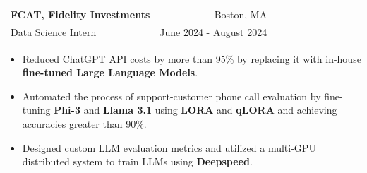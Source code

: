 \documentclass[a4paper]{article}
\makeatletter
\newcommand{\resumeItemWithoutTitle}[1]{
  \item\small{
    {\vspace{-2pt}}
  }
}
\newcommand{\resumeSubheading}[4]{
  \vspace{-1pt}\item
    \begin{tabular*}{0.97\textwidth}{l@{\extracolsep{\fill}}r}
      \textbf{#1} & #2 \\
      {#3} & {#4} \\
    \end{tabular*}\vspace{-5pt}
}
\newcommand{\resumeItemListStart}{\begin{itemize}[leftmargin=*]}
\newcommand{\resumeItemListEnd}{\end{itemize}\vspace{-5pt}}
\makeatother
\begin{document}
  \resumeSubheading{FCAT, Fidelity Investments}{Boston, MA}
    {\underline{Data Science Intern}}{June 2024 - August 2024}
    \resumeItemListStart
\vspace{1pt}
      \resumeItemWithoutTitle{Multi Touch Attribution Project}
    {
        Reduced ChatGPT API costs by more than 95\% by replacing it with in-house \textbf{fine-tuned Large Language Models}. 
    }
      \resumeItemWithoutTitle{Multi Touch Attribution Project}
    {
        Automated the process of support-customer phone call evaluation by fine-tuning  \textbf{Phi-3} and \textbf{Llama 3.1} using \textbf{LORA} and \textbf{qLORA} and achieving accuracies greater than 90\%. 
    }
                
      \resumeItemWithoutTitle{Multi Touch Attribution Project}
    {
          Designed custom LLM evaluation metrics and utilized a multi-GPU distributed system to train LLMs using \textbf{Deepspeed}. %
      }          
          \resumeItemListEnd
          
\end{document}
